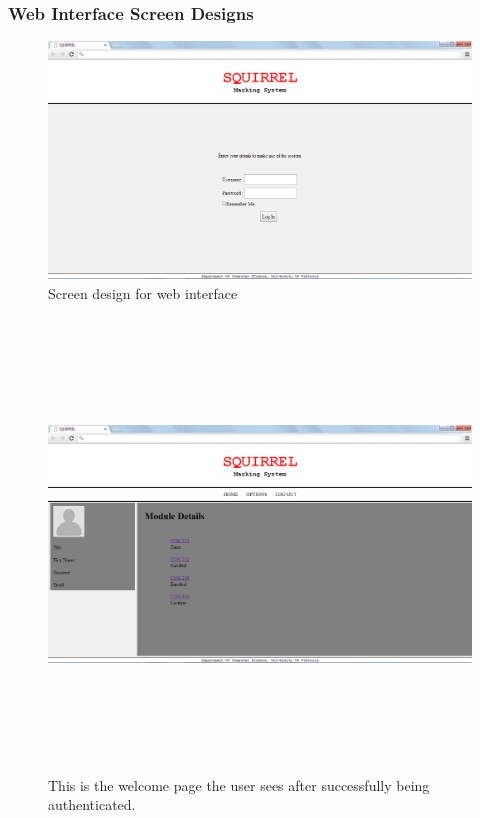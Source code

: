 \documentclass[12pt]{article}
\begin{document}
	\pagebreak
	
	\subsubsection{Web Interface Screen Designs}
	
		\begin{figure}[htbp]
		\centering
		\includegraphics[width=1.0\linewidth]{./Diagrams/web_login}
		\caption{Screen design for web interface}
		\label{fig:web_login}
		\end{figure}
			
		\begin{figure}[htbp]
		\centering
		\includegraphics[width=1.0\linewidth, height=12cm]{./Diagrams/web_modules&roles}
		\caption{This is the welcome page the user sees after successfully being authenticated.}
		\label{fig:web_modules&roles}
		\end{figure}
	
\end{document}
